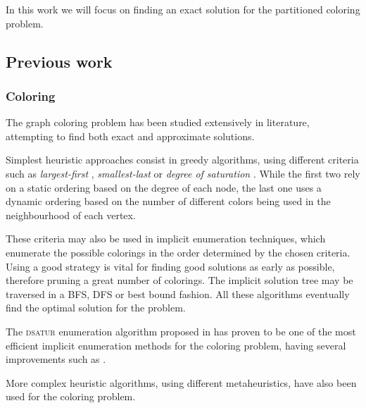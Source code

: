 In this work we will focus on finding an exact solution for the partitioned coloring problem.

\subsection{Previous work}
\label{subsec:previouswork}

\subsubsection{Coloring}

The graph coloring problem has been studied extensively in literature, attempting to find both exact and approximate solutions.

Simplest heuristic approaches consist in greedy algorithms, using different criteria such as \textit{largest-first} \cite{welsh1967upper}, \textit{smallest-last} \cite{matula1972graph} or \textit{degree of saturation} \cite{brelaz1979new}. While the first two rely on a static ordering based on the degree of each node, the last one uses a dynamic ordering based on the number of different colors being used in the neighbourhood of each vertex.

These criteria may also be used in implicit enumeration techniques, which enumerate the possible colorings in the order determined by the chosen criteria. Using a good strategy is vital for finding good solutions as early as possible, therefore pruning a great number of colorings. The implicit solution tree may be traversed in a BFS, DFS or best bound fashion. All these algorithms eventually find the optimal solution for the problem.

The \textsc{dsatur} enumeration algorithm proposed in \cite{brelaz1979new} has proven to be one of the most efficient implicit enumeration methods for the coloring problem, having several improvements such as \cite{sewell1996improved}.

More complex heuristic algorithms, using different metaheuristics, have also been used for the coloring problem.


